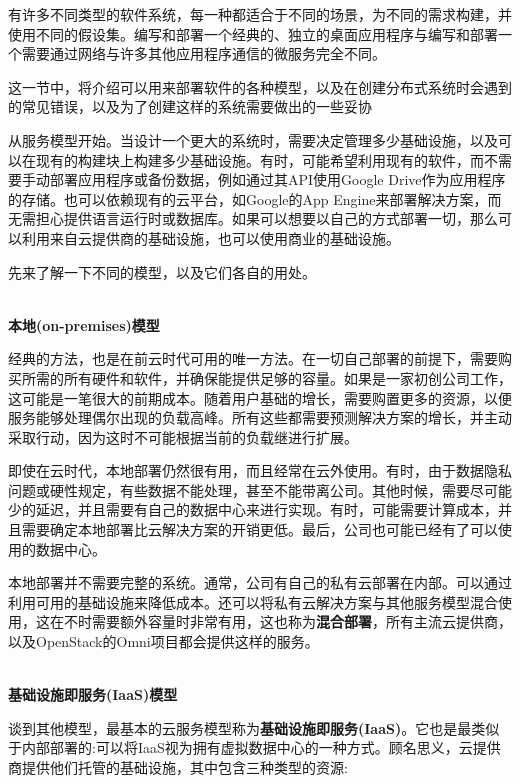 
有许多不同类型的软件系统，每一种都适合于不同的场景，为不同的需求构建，并使用不同的假设集。编写和部署一个经典的、独立的桌面应用程序与编写和部署一个需要通过网络与许多其他应用程序通信的微服务完全不同。

这一节中，将介绍可以用来部署软件的各种模型，以及在创建分布式系统时会遇到的常见错误，以及为了创建这样的系统需要做出的一些妥协


从服务模型开始。当设计一个更大的系统时，需要决定管理多少基础设施，以及可以在现有的构建块上构建多少基础设施。有时，可能希望利用现有的软件，而不需要手动部署应用程序或备份数据，例如通过其API使用Google Drive作为应用程序的存储。也可以依赖现有的云平台，如Google的App Engine来部署解决方案，而无需担心提供语言运行时或数据库。如果可以想要以自己的方式部署一切，那么可以利用来自云提供商的基础设施，也可以使用商业的基础设施。

先来了解一下不同的模型，以及它们各自的用处。

\hspace*{\fill} \\ %
\noindent
\textbf{本地(on-premises)模型}

经典的方法，也是在前云时代可用的唯一方法。在一切自己部署的前提下，需要购买所需的所有硬件和软件，并确保能提供足够的容量。如果是一家初创公司工作，这可能是一笔很大的前期成本。随着用户基础的增长，需要购置更多的资源，以便服务能够处理偶尔出现的负载高峰。所有这些都需要预测解决方案的增长，并主动采取行动，因为这时不可能根据当前的负载继进行扩展。

即使在云时代，本地部署仍然很有用，而且经常在云外使用。有时，由于数据隐私问题或硬性规定，有些数据不能处理，甚至不能带离公司。其他时候，需要尽可能少的延迟，并且需要有自己的数据中心来进行实现。有时，可能需要计算成本，并且需要确定本地部署比云解决方案的开销更低。最后，公司也可能已经有了可以使用的数据中心。

本地部署并不需要完整的系统。通常，公司有自己的私有云部署在内部。可以通过利用可用的基础设施来降低成本。还可以将私有云解决方案与其他服务模型混合使用，这在不时需要额外容量时非常有用，这也称为\textbf{混合部署}，所有主流云提供商，以及OpenStack的Omni项目都会提供这样的服务。

\hspace*{\fill} \\ %
\noindent
\textbf{基础设施即服务(IaaS)模型}

谈到其他模型，最基本的云服务模型称为\textbf{基础设施即服务(IaaS)}。它也是最类似于内部部署的:可以将IaaS视为拥有虚拟数据中心的一种方式。顾名思义，云提供商提供他们托管的基础设施，其中包含三种类型的资源:

